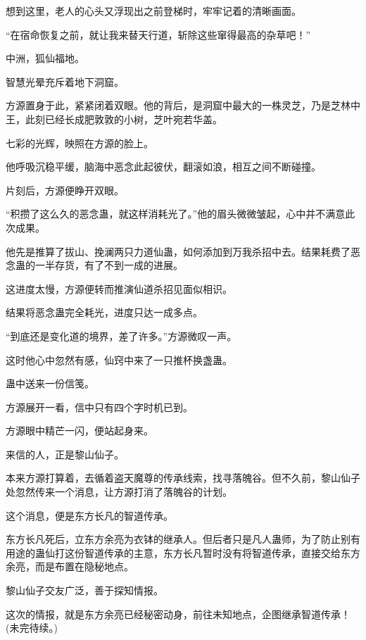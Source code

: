 \begin{this_body}
想到这里，老人的心头又浮现出之前登梯时，牢牢记着的清晰画面。

“在宿命恢复之前，就让我来替天行道，斩除这些窜得最高的杂草吧！”

中洲，狐仙福地。

智慧光晕充斥着地下洞窟。

方源置身于此，紧紧闭着双眼。他的背后，是洞窟中最大的一株灵芝，乃是芝林中王，此刻已经长成肥敦敦的小树，芝叶宛若华盖。

七彩的光辉，映照在方源的脸上。

他呼吸沉稳平缓，脑海中恶念此起彼伏，翻滚如浪，相互之间不断碰撞。

片刻后，方源便睁开双眼。

“积攒了这么久的恶念蛊，就这样消耗光了。”他的眉头微微皱起，心中并不满意此次成果。

他先是推算了拔山、挽澜两只力道仙蛊，如何添加到万我杀招中去。结果耗费了恶念蛊的一半存货，有了不到一成的进展。

这进度太慢，方源便转而推演仙道杀招见面似相识。

结果将恶念蛊完全耗光，进度只达一成多点。

“到底还是变化道的境界，差了许多。”方源微叹一声。

这时他心中忽然有感，仙窍中来了一只推杯换盏蛊。

蛊中送来一份信笺。

方源展开一看，信中只有四个字时机已到。

方源眼中精芒一闪，便站起身来。

来信的人，正是黎山仙子。

本来方源打算着，去循着盗天魔尊的传承线索，找寻落魄谷。但不久前，黎山仙子处忽然传来一个消息，让方源打消了落魄谷的计划。

这个消息，便是东方长凡的智道传承。

东方长凡死后，立东方余亮为衣钵的继承人。但后者只是凡人蛊师，为了防止别有用途的蛊仙打这份智道传承的主意，东方长凡暂时没有将智道传承，直接交给东方余亮，而是布置在隐秘地点。

黎山仙子交友广泛，善于探知情报。

这次的情报，就是东方余亮已经秘密动身，前往未知地点，企图继承智道传承！(未完待续。)

\end{this_body}

